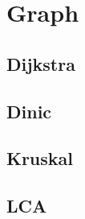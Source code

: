 \section{Graph}


\subsection{Dijkstra}


\subsection{Dinic}


\subsection{Kruskal}


\subsection{LCA}

